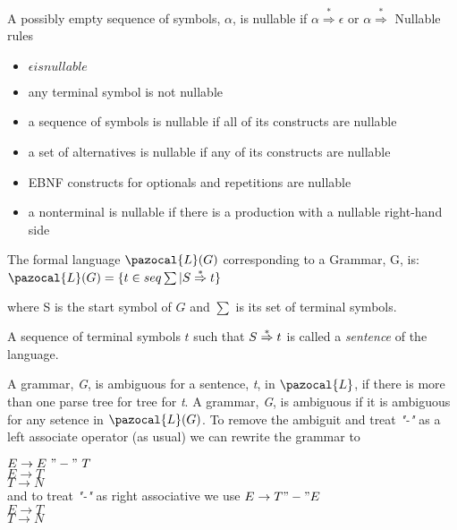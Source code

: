 A possibly empty sequence of symbols, $\alpha$, is nullable if  $\alpha \stackrel{*}{\Rightarrow} \epsilon$ or $\alpha \stackrel{*}{\Rightarrow}$
Nullable rules
\begin{itemize}
        \item $\epsilon is nullable$
        \item any terminal symbol is not nullable
        \item a sequence of symbols is nullable if all of its constructs are nullable
        \item a set of alternatives is nullable if any of its constructs are nullable
        \item EBNF constructs for optionals and repetitions are nullable
        \item a nonterminal is nullable if there is a production with a nullable right-hand side
\end{itemize}

The formal language $\pazocal{L}(G)$ corresponding to a Grammar, G, is:
$\pazocal{L}(G) = \{t \in seq \sum | S \stararrow t \}$

where S is the start symbol of $G$ and $\sum$ is its set of terminal symbols.

A sequence of terminal symbols $t$ such that $S \stackrel{*}{\Rightarrow} t$ is called a \emph{sentence} of the language.

A grammar, \emph{G}, is ambiguous for a sentence, \emph{t}, in $\pazocal{L}$, if there is more than one parse tree for tree for \emph{t}.
A grammar, \emph{G}, is ambiguous if it is ambiguous for any setence in $\pazocal{L}(G)$.
To remove the ambiguit and treat \emph{"-"} as  a left associate operator (as usual) we can rewrite the grammar to

$E \rightarrow E \ "-" \ T$ \\
$E \rightarrow T$ \\
$T \rightarrow N$ \\
and to treat \emph{"-"} as right associative we use
$E \rightarrow T "-" E$ \\
$E \rightarrow T$ \\
$T \rightarrow N$ \\